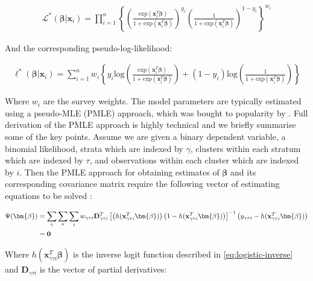 \begin{align}
\label{eq:logistic-pseudo}
\mathcal{L}^{*}(\bm{\beta} | \mathbf{x}_{i})		=	\prod_{i = 1}^{n} \left\{ \left( \frac{ \text{exp}(\mathbf{x}_{i}^{T} \bm{\beta}) }{ 1 + \text{exp}(\mathbf{x}_{i}^{T} \bm{\beta}) } \right) ^ {y_{i}} \left( \frac{ 1 }{ 1 + \text{exp}(\mathbf{x}_{i}^{T} \bm{\beta}) } \right) ^ {1 - y_{i}} \right\} ^ {w_{i}}
\end{align}

And the corresponding pseudo-log-likelihood:

\begin{align}
\label{eq:logistic-pseudo-log}
\ell^{*}(\bm{\beta} | \mathbf{x}_{i})			=	\sum_{i = 1}^{n} w_{i} \left\{ y_{i} \text{log} \left( \frac{ \text{exp}(\mathbf{x}_{i}^{T} \bm{\beta}) }{ 1 + \text{exp}(\mathbf{x}_{i}^{T} \bm{\beta}) } \right) + (1 - y_{i}) \text{log} \left( \frac{ 1 }{ 1 + \text{exp}(\mathbf{x}_{i}^{T} \bm{\beta}) } \right) \right\}
\end{align}

Where $w_{i}$ are the survey weights. The model parameters are typically estimated using a pseudo-MLE (PMLE) approach, which was bought to popularity by \citet{roberts1987}. Full derivation of the PMLE approach is highly technical and we briefly summarise some of the key points. Assume we are given a binary dependent variable, a binomial likelihood, strata which are indexed by $\gamma$, clusters within each stratum which are indexed by $\tau$, and observations within each cluster which are indexed by $i$. Then the PMLE approach for obtaining estimates of $\bm{\beta}$ and its corresponding covariance matrix require the following vector of estimating equations to be solved \citep{binder1983}:

\begin{align}
\label{eq:logistic-eqns}
\Psi(\bm{\beta}) 	&= \sum_{\gamma} \sum_{\tau} \sum_{i} w_{\gamma \tau i} \mathbf{D}_{\gamma \tau i}^{T} \left[ \left( h(\mathbf{x}_{\gamma \tau i}^{T} \bm{\beta}) \right) \left( 1 - h(\mathbf{x}_{\gamma \tau i}^{T} \bm{\beta}) \right) \right] ^ {-1} \left( y_{\gamma \tau i} - h(\mathbf{x}_{\gamma \tau i}^{T} \bm{\beta}) \right) \\
\notag
			&= \mathbf{0}	
\end{align}

Where $h(\mathbf{x}_{\gamma \tau i}^{T} \bm{\beta})$ is the inverse logit function described in \autoref{eq:logistic-inverse} and $\mathbf{D}_{\gamma \tau i}$ is the vector of partial derivatives:

